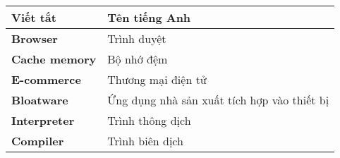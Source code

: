 \documentclass[../BTL.tex]{subfiles}
\begin{document}
\begin{longtable}{l p{14cm}}
	\hline
   \textbf{Viết tắt}  & \textbf{Tên tiếng Anh} \\ \hline 
	\textbf{Browser} & Trình duyệt \\
	\textbf{Cache memory} & Bộ nhớ đệm \\
	\textbf{E-commerce} & Thương mại điện tử \\
	\textbf{Bloatware} & Ứng dụng nhà sản xuất tích hợp vào thiết bị \\
	\textbf{Interpreter}  &  Trình thông dịch \\
    \textbf{Compiler}  &  Trình biên dịch \\

    \hline
\end{longtable}
\end{document}
